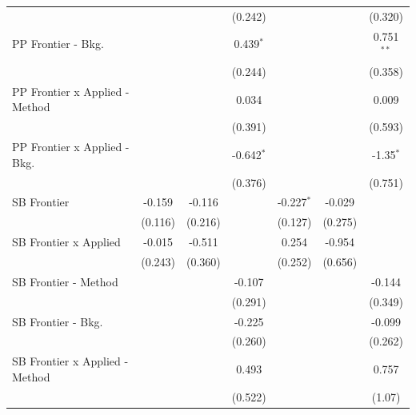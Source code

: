 \begin{tabular}{lcccccc}
                                  &         &              & (0.242)       &               &              & (0.320)\\   
   PP Frontier - Bkg.             &         &              & 0.439$^{*}$   &               &              & 0.751$^{**}$\\   
                                  &         &              & (0.244)       &               &              & (0.358)\\   
   PP Frontier x Applied - Method &         &              & 0.034         &               &              & 0.009\\   
                                  &         &              & (0.391)       &               &              & (0.593)\\   
   PP Frontier x Applied - Bkg.   &         &              & -0.642$^{*}$  &               &              & -1.35$^{*}$\\   
                                  &         &              & (0.376)       &               &              & (0.751)\\   
   SB Frontier                    & -0.159  & -0.116       &               & -0.227$^{*}$  & -0.029       &   \\   
                                  & (0.116) & (0.216)      &               & (0.127)       & (0.275)      &   \\   
   SB Frontier x Applied          & -0.015  & -0.511       &               & 0.254         & -0.954       &   \\   
                                  & (0.243) & (0.360)      &               & (0.252)       & (0.656)      &   \\   
   SB Frontier - Method           &         &              & -0.107        &               &              & -0.144\\   
                                  &         &              & (0.291)       &               &              & (0.349)\\   
   SB Frontier - Bkg.             &         &              & -0.225        &               &              & -0.099\\   
                                  &         &              & (0.260)       &               &              & (0.262)\\   
   SB Frontier x Applied - Method &         &              & 0.493         &               &              & 0.757\\   
                                  &         &              & (0.522)       &               &              & (1.07)\\   

\end{tabular}
